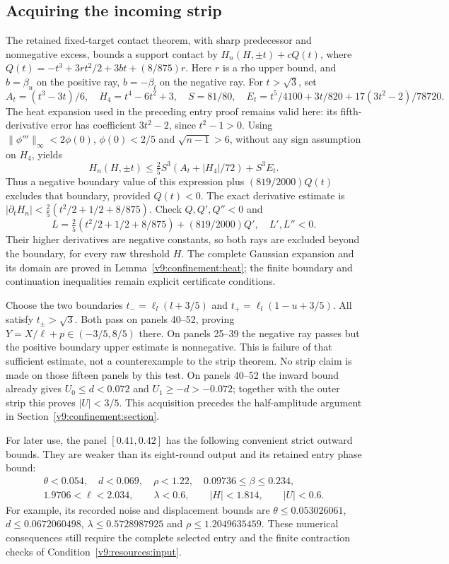 \subsection{Acquiring the incoming strip}\label{v9:resources:strip}
The retained fixed-target contact theorem, with sharp predecessor and
nonnegative excess, bounds a support contact by \(H_n(H,\pm t)+cQ(t)\),
where
\(Q(t)=-t^3+3rt^2/2+3bt+(8/875)r\).
Here \(r\) is a rho upper bound, and \(b=\beta_u\) on the positive ray,
\(b=-\beta_l\) on the negative ray.
For \(t>\sqrt3\), set
\[
 A_t=(t^3-3t)/6,\quad H_4=t^4-6t^2+3,\quad S=81/80,
\quad E_t=t^5/4100+3t/820+17(3t^2-2)/78720.
\]
The heat expansion used in the preceding entry proof remains valid here:
its fifth-derivative error has coefficient \(3t^2-2\), since \(t^2-1>0\).
Using \(\|\phi'''\|_\infty<2\phi(0)\), \(\phi(0)<2/5\) and
\(\sqrt{n-1}>6\), without any sign assumption on \(H_4\), yields
\[
 H_n(H,\pm t)\le \tfrac25S^3(A_t+|H_4|/72)+S^3E_t.
\]
Thus a negative boundary value of this expression plus
\((819/2000)Q(t)\) excludes that boundary, provided \(Q(t)<0\).
The exact derivative estimate is
\(|\partial_tH_n|<\tfrac25(t^2/2+1/2+8/875)\).
Check \(Q,Q',Q''<0\) and
\[
 L=\tfrac25(t^2/2+1/2+8/875)+(819/2000)Q',\quad L',L''<0.
\]
Their higher derivatives are negative constants, so both rays are excluded
beyond the boundary, for every raw threshold \(H\).
The complete Gaussian expansion and its domain are proved in
Lemma~\ref{v9:confinement:heat}; the finite boundary and continuation
inequalities remain explicit certificate conditions.

Choose the two boundaries
\(t_-=\ell_l(l+3/5)\) and \(t_+=\ell_l(1-u+3/5)\).
All satisfy \(t_\pm>\sqrt3\). Both pass on panels 40--52, proving
\(Y=X/\ell+p\in(-3/5,8/5)\) there.
On panels 25--39 the negative ray passes but the positive boundary
upper estimate is nonnegative. This is failure of that sufficient estimate,
not a counterexample to the strip theorem. No strip claim is made on those
fifteen panels by this test. On panels 40--52 the inward bound already
gives $U_0\le d<0.072$ and $U_1\ge-d>-0.072$; together with the
outer strip this proves $|U|<3/5$. This acquisition precedes the
half-amplitude argument in Section~\ref{v9:confinement:section}.

For later use, the panel $[0.41,0.42]$ has the following convenient
strict outward bounds. They are weaker than its eight-round output and
its retained entry phase bound:
\begin{equation}\label{v9:resources:central-entry}
\begin{gathered}
 \theta<0.054,\quad d<0.069,\quad\rho<1.22,\quad
 0.09736\le\beta\le0.234,\\
 1.9706<\ell<2.034,\qquad\lambda<0.6,\qquad |H|<1.814,
 \qquad |U|<0.6.
\end{gathered}
\end{equation}
For example, its recorded noise and displacement bounds are
$\theta\le0.053026061$, $d\le0.0672060498$,
$\lambda\le0.5728987925$ and $\rho\le1.2049635459$.
These numerical consequences still require the complete selected entry
and the finite contraction checks of Condition~\ref{v9:resources:input}.

